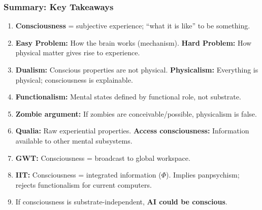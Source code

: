 \bigseparator

\subsubsection{Summary: Key Takeaways}

\begin{thmbox}
\begin{enumerate}
  \item \textbf{Consciousness} = subjective experience; ``what it is like'' to be something.
  \item \textbf{Easy Problem:} How the brain works (mechanism). \textbf{Hard Problem:} How physical matter gives rise to experience.
  \item \textbf{Dualism:} Conscious properties are not physical. \textbf{Physicalism:} Everything is physical; consciousness is explainable.
  \item \textbf{Functionalism:} Mental states defined by functional role, not substrate.
  \item \textbf{Zombie argument:} If zombies are conceivable/possible, physicalism is false.
  \item \textbf{Qualia:} Raw experiential properties. \textbf{Access consciousness:} Information available to other mental subsystems.
  \item \textbf{GWT:} Consciousness = broadcast to global workspace.
  \item \textbf{IIT:} Consciousness = integrated information ($\Phi$). Implies panpsychism; rejects functionalism for current computers.
  \item If consciousness is substrate-independent, \textbf{AI could be conscious}.
\end{enumerate}
\end{thmbox}

